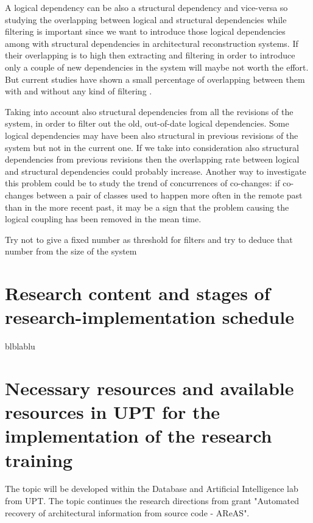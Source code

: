 \documentclass[12pt,a4paper,oneside]{report}
\begin{document}
A logical dependency can be also a structural dependency and vice-versa so studying the overlapping between logical and structural dependencies while filtering is important since we want to introduce those logical dependencies among with structural dependencies in architectural reconstruction systems. If their overlapping is to high then extracting and filtering in order to introduce only a couple of new dependencies in the system will maybe not worth the effort. But current studies have shown a small percentage of overlapping between them with and without any kind of filtering \cite{DBLP:journals/jss/AjienkaC17}. 

Taking into account also structural dependencies from all the revisions of the system, in order to filter out the old, out-of-date logical dependencies.  Some logical dependencies may have been also structural in previous revisions of the system but not in the current one. If we take into consideration also structural dependencies from previous revisions then the overlapping rate between logical and structural dependencies could probably increase. Another way to investigate this problem could be to study the trend of concurrences of co-changes: if co-changes between a pair of classes used to happen more often in the remote past than in the more recent past, it may be a sign that the problem causing the logical coupling has been removed in the mean time. 
 


Try not to give a fixed number as threshold for filters and try to deduce that number from the size of the system  

\chapter{Research content and stages of research-implementation schedule}
blblablu

{\let\clearpage\relax \chapter{Necessary resources and available resources in UPT for the implementation of the research training}}

The topic will be developed within the Database and Artificial Intelligence lab from UPT. The topic continues the research directions from grant "Automated recovery of architectural information from source code - AReAS".



\end{document}
